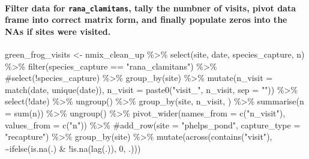 \documentclass[
  letterpaper,
  DIV=11,
  numbers=noendperiod]{scrartcl}
\let\oldparagraph\paragraph
\renewcommand{\paragraph}[1]{\oldparagraph{#1}\mbox{}}
\newenvironment{Shaded}{\begin{snugshade}}{\end{snugshade}}
\newcommand{\AttributeTok}[1]{\textcolor[rgb]{0.40,0.45,0.13}{#1}}
\newcommand{\CommentTok}[1]{\textcolor[rgb]{0.37,0.37,0.37}{#1}}
\newcommand{\DecValTok}[1]{\textcolor[rgb]{0.68,0.00,0.00}{#1}}
\newcommand{\FunctionTok}[1]{\textcolor[rgb]{0.28,0.35,0.67}{#1}}
\newcommand{\NormalTok}[1]{\textcolor[rgb]{0.00,0.23,0.31}{#1}}
\newcommand{\OtherTok}[1]{\textcolor[rgb]{0.00,0.23,0.31}{#1}}
\newcommand{\SpecialCharTok}[1]{\textcolor[rgb]{0.37,0.37,0.37}{#1}}
\newcommand{\StringTok}[1]{\textcolor[rgb]{0.13,0.47,0.30}{#1}}
\begin{document}
\hypertarget{filter-data-for-rana_clamitans-tally-the-numbner-of-visits-pivot-data-frame-into-correct-matrix-form-and-finally-populate-zeros-into-the-nas-if-sites-were-visited.}{%
\paragraph{\texorpdfstring{Filter data for \texttt{rana\_clamitans},
tally the numbner of visits, pivot data frame into correct matrix form,
and finally populate zeros into the NAs if sites were
visited.}{Filter data for rana\_clamitans, tally the numbner of visits, pivot data frame into correct matrix form, and finally populate zeros into the NAs if sites were visited.}}\label{filter-data-for-rana_clamitans-tally-the-numbner-of-visits-pivot-data-frame-into-correct-matrix-form-and-finally-populate-zeros-into-the-nas-if-sites-were-visited.}}

\begin{Shaded}
\begin{Highlighting}[]
\NormalTok{green\_frog\_visits }\OtherTok{\textless{}{-}}\NormalTok{ nmix\_clean\_up }\SpecialCharTok{\%\textgreater{}\%} 
  \FunctionTok{select}\NormalTok{(site, date, species\_capture, n) }\SpecialCharTok{\%\textgreater{}\%} 
  \FunctionTok{filter}\NormalTok{(species\_capture }\SpecialCharTok{==} \StringTok{"rana\_clamitans"}\NormalTok{) }\SpecialCharTok{\%\textgreater{}\%} 
  \CommentTok{\#select(!species\_capture) \%\textgreater{}\% }
  \FunctionTok{group\_by}\NormalTok{(site) }\SpecialCharTok{\%\textgreater{}\%} 
  \FunctionTok{mutate}\NormalTok{(}\AttributeTok{n\_visit =} \FunctionTok{match}\NormalTok{(date, }\FunctionTok{unique}\NormalTok{(date)),}
         \AttributeTok{n\_visit =} \FunctionTok{paste0}\NormalTok{(}\StringTok{"visit\_"}\NormalTok{, n\_visit, }\AttributeTok{sep =} \StringTok{""}\NormalTok{)) }\SpecialCharTok{\%\textgreater{}\%} 
  \FunctionTok{select}\NormalTok{(}\SpecialCharTok{!}\NormalTok{date) }\SpecialCharTok{\%\textgreater{}\%} 
  \FunctionTok{ungroup}\NormalTok{() }\SpecialCharTok{\%\textgreater{}\%}
  \FunctionTok{group\_by}\NormalTok{(site, n\_visit, ) }\SpecialCharTok{\%\textgreater{}\%} 
  \FunctionTok{summarise}\NormalTok{(}\AttributeTok{n =} \FunctionTok{sum}\NormalTok{(n)) }\SpecialCharTok{\%\textgreater{}\%} 
  \FunctionTok{ungroup}\NormalTok{() }\SpecialCharTok{\%\textgreater{}\%} 
  \FunctionTok{pivot\_wider}\NormalTok{(}\AttributeTok{names\_from =} \FunctionTok{c}\NormalTok{(}\StringTok{"n\_visit"}\NormalTok{), }\AttributeTok{values\_from =} \FunctionTok{c}\NormalTok{(}\StringTok{"n"}\NormalTok{)) }\SpecialCharTok{\%\textgreater{}\%} 
  \CommentTok{\#add\_row(site = "phelps\_pond", capture\_type = "recapture") \%\textgreater{}\% }
  \FunctionTok{group\_by}\NormalTok{(site) }\SpecialCharTok{\%\textgreater{}\%} 
  \FunctionTok{mutate}\NormalTok{(}\FunctionTok{across}\NormalTok{(}\FunctionTok{contains}\NormalTok{(}\StringTok{"visit"}\NormalTok{), }
                \SpecialCharTok{\textasciitilde{}}\FunctionTok{ifelse}\NormalTok{(}\FunctionTok{is.na}\NormalTok{(.) }\SpecialCharTok{\&}
                          \SpecialCharTok{!}\FunctionTok{is.na}\NormalTok{(}\FunctionTok{lag}\NormalTok{(.)), }\DecValTok{0}\NormalTok{, .))) }
\end{Highlighting}
\end{Shaded}
\end{document}
